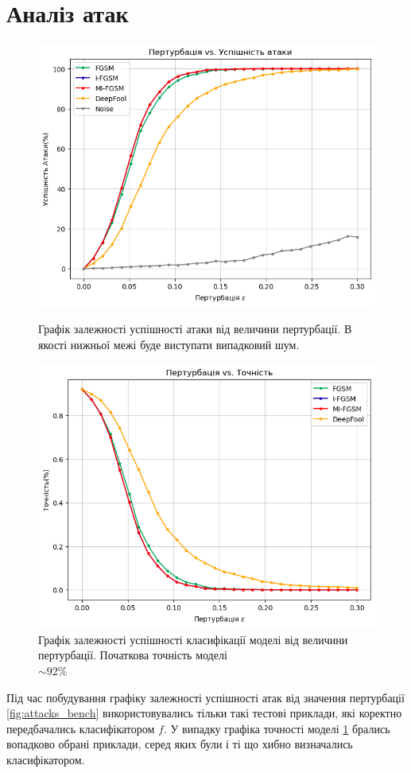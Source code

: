 \documentclass[a4paper,14pt]{extreport}
\begin{document}
	\section{Аналіз атак}
	
	\begin{figure}[!htb]
		\includegraphics[width=1\textwidth]{resources/attacks_bench_8_6.png}
		\caption{Графік залежності успішності атаки від величини пертурбації. В якості нижньої межі буде виступати випадковий шум. }
		\label{fig:attacks_bench}
		\endminipage\hfill
		\includegraphics[width=1\textwidth]{resources/defenses_bench_8_6.png}
		\caption{Графік залежності успішності класифікації моделі від величини пертурбації. Початкова точність моделі \\ $\sim 92\%$}
		\label{fig:defenses_bench}
		\endminipage
	\end{figure}
	Під час побудування графіку залежності успішності атак від значення пертурбації \ref{fig:attacks_bench} використовувались тільки такі тестові приклади, які коректно передбачались класифікатором $f$. У випадку графіка точності моделі \ref{fig:defenses_bench} брались вопадково обрані приклади, серед яких були і ті що хибно визначались класифікатором.
	
\end{document}
